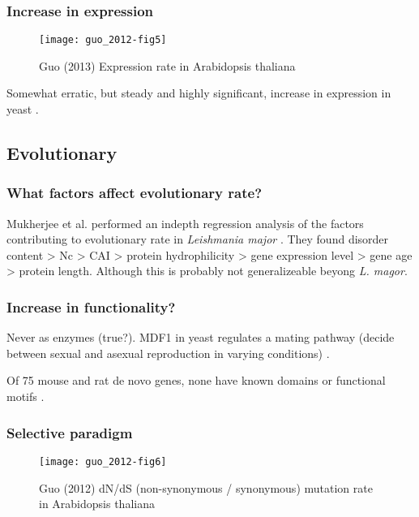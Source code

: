   \subsubsection{Increase in expression}

    \begin{figure}[!hbpt] \centering
        \texttt{[image: guo\_2012-fig5]} \caption{ Guo (2013)
            Expression rate in Arabidopsis thaliana
            \cite{guo_gene_2013} } \end{figure} \FloatBarrier

    Somewhat erratic, but steady and highly significant, increase in
    expression in yeast \cite{carvunis_proto-genes_2012}.

\subsection{Evolutionary}

  \subsubsection{What factors affect evolutionary rate?}

    Mukherjee et al. performed an indepth regression analysis of the factors
    contributing to evolutionary rate in \textit{Leishmania major}
    \cite{mukherjee_elucidating_2015}. They found disorder content > Nc > CAI >
    protein hydrophilicity > gene expression level > gene age > protein
    length. Although this is probably not generalizeable beyong \textit{L.
    magor}.
    

    \subsubsection{Increase in functionality?}
                
        Never as enzymes (true?). MDF1 in yeast regulates a mating pathway
        (decide between sexual and asexual reproduction in varying
        conditions) \cite{li_novo_2010}.

        Of 75 mouse and rat de novo genes, none have known domains or
        functional motifs \cite{murphy_novo_2012}.

    \subsubsection{Selective paradigm}

        \begin{figure}[!hbpt] \centering
            \texttt{[image: guo\_2012-fig6]} \caption{ Guo (2012)
                dN/dS (non-synonymous / synonymous) mutation rate in
                Arabidopsis thaliana \cite{guo_gene_2013} } \end{figure}

